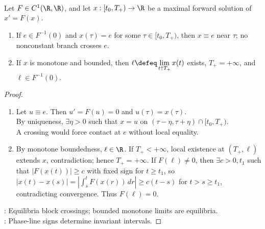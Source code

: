 \begin{lemma} \label{lem:scalar-phase-line-barrier-limit} \\
Let $F\in C^1(\R,\R)$, and let $x:[t_0,T_+)\to\R$ be a maximal forward solution of $x'=F(x)$.
\begin{enumerate}[label=(\roman*)]
\setlength{\itemsep}{0pt}
\item If $e\in F^{-1}(0)$ and $x(\tau)=e$ for some $\tau\in[t_0,T_+)$, then $x\equiv e$ near $\tau$; no nonconstant branch crosses $e$.
\item If $x$ is monotone and bounded, then $\ell\defeq\lim\limits_{t\uparrow T_+}x(t)$ exists, $T_+=+\infty$, and $\ell\in F^{-1}(0)$.
\end{enumerate}
\begin{proof}
\begin{enumerate}[label=(\roman*)]
\setlength{\itemsep}{0pt}
\item Let $u\equiv e$. Then $u'=F(u)=0$ and $u(\tau)=x(\tau)$.\\
By uniqueness, $\exists\eta>0$ such that $x=u$ on $(\tau-\eta,\tau+\eta)\cap[t_0,T_+)$.\\
A crossing would force contact at $e$ without local equality.
\item By monotone boundedness, $\ell\in\R$. If $T_+<+\infty$, local existence at $(T_+,\ell)$ extends $x$, contradiction; hence $T_+=+\infty$. If $F(\ell)\neq0$, then $\exists c>0,t_1$ such that $|F(x(t))|\geq c$ with fixed sign for $t\geq t_1$, so $|x(t)-x(s)|=\left|\int_s^t F(x(r))\,dr\right|\geq c(t-s)$ for $t>s\geq t_1$, contradicting convergence. Thus $F(\ell)=0$.
\end{enumerate}
: Equilibria block crossings; bounded monotone limits are equilibria.\\
: Phase-line signs determine invariant intervals.
\end{proof}
\end{lemma}


